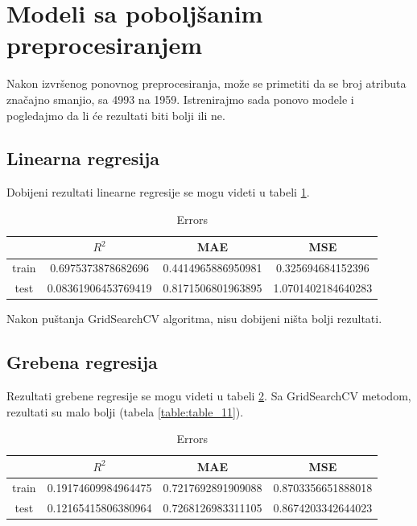 \documentclass[a4paper]{article}
\begin{document}
\section{Modeli sa poboljšanim preprocesiranjem}
\label{sec:modeli_2}

Nakon izvršenog ponovnog preprocesiranja, može se primetiti da se broj atributa značajno smanjio, sa 4993 na 1959. Istrenirajmo sada ponovo modele i pogledajmo da li će rezultati biti bolji ili ne.

\subsection{Linearna regresija}
\label{sec:linearna_regresija_2}

Dobijeni rezultati linearne regresije se mogu videti u tabeli \ref{table:table_9}.

\begin{table}[h!]
\caption{Errors}
\centering %
\begin{tabular}{c c c c} %
\hline\hline %
 & ${R}^2$ & MAE & MSE \\ [0.2ex] %
\hline %
train & 0.6975373878682696 & 0.4414965886950981 & 0.325694684152396 \\ %
test & 0.08361906453769419 & 0.8171506801963895 & 1.0701402184640283 \\ [1ex] %
\end{tabular}
\label{table:table_9}
\end{table}

Nakon puštanja GridSearchCV algoritma, nisu dobijeni ništa bolji rezultati.

\subsection{Grebena regresija}
\label{sec:grebena_regresija_2}

Rezultati grebene regresije se mogu videti u tabeli \ref{table:table_10}. Sa GridSearchCV metodom, rezultati su malo bolji (tabela \ref{table:table_11}).

\begin{table}[h!]
\caption{Errors}
\centering %
\begin{tabular}{c c c c} %
\hline\hline %
 & ${R}^2$ & MAE & MSE \\ [0.2ex] %
\hline %
train & 0.19174609984964475 & 0.7217692891909088 & 0.8703356651888018 \\ %
test & 0.12165415806380964 & 0.7268126983311105 & 0.8674203342644023 \\ %
\end{tabular}
\label{table:table_10}
\end{table}
\end{document}
